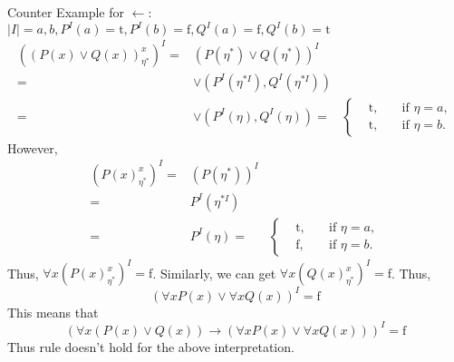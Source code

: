 \begin{enumerate}
Counter Example for $\leftarrow$: \\
$|I| = {a, b}, P^I(a) = \mathrm{t}, P^I(b) = \mathrm{f}, Q^I(a) = \mathrm{f}, Q^I(b) = \mathrm{t}$ 
\begin{eqnarray*}
((P(x) \vee Q(x))^x_{\eta^*})^I = & (P(\eta^*) \vee Q(\eta^*))^I \\
                                = & \vee(P^I (\eta^{*I}), Q^I (\eta^{*I})) \\
                                = & \vee(P^I (\eta), Q^I (\eta)) 
                                = &    \left\{
                                        \begin{array}{ccc}      
                                        &\mathrm{t}, \quad &\text{if }  \eta = a, \\
                                        &\mathrm{t}, \quad &\text{if }  \eta = b.
                                        \end{array}\right.    
\end{eqnarray*}
However, 
\begin{eqnarray*}
(P(x)^x_{\eta^*})^I = & (P(\eta^*))^I \\
                    = & P^I (\eta^{*I}) \\
                    = & P^I (\eta) 
                    = & \left\{
                    \begin{array}{ccc}      
                    &\mathrm{t}, \quad &\text{if }  \eta = a, \\
                    &\mathrm{f}, \quad &\text{if }  \eta = b.
                    \end{array}\right.                        
\end{eqnarray*}
Thus, $\forall x (P(x)^x_{\eta^*})^I = \mathrm{f}$. Similarly, we can get $\forall x (Q(x)^x_{\eta^*})^I = \mathrm{f}$. Thus, 
\begin{equation*}
(\forall x P(x) \vee \forall x Q(x))^I = \mathrm{f}
\end{equation*}
This means that
\begin{equation*}
( \forall x (P(x) \vee Q(x)) \rightarrow (\forall x P(x) \vee \forall x Q(x)))^I = \mathrm{f}
\end{equation*}
Thus rule doesn't hold for the above interpretation. 

\newpage


\end{enumerate}
